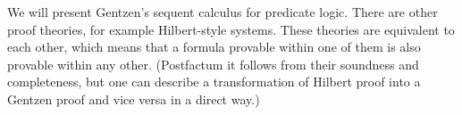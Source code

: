 

\setcounter{section}{2}
\setcounter{subsection}{0}
\setcounter{dfn}{0}

We will present Gentzen's sequent calculus for predicate logic.
There are other proof theories, for example Hilbert-style systems.
These theories are equivalent to each other, which means that a formula provable within one of them is also provable within any other.
(Postfactum it follows from their soundness and completeness,
but one can describe a transformation of Hilbert proof into a Gentzen proof and vice versa in a direct way.)




